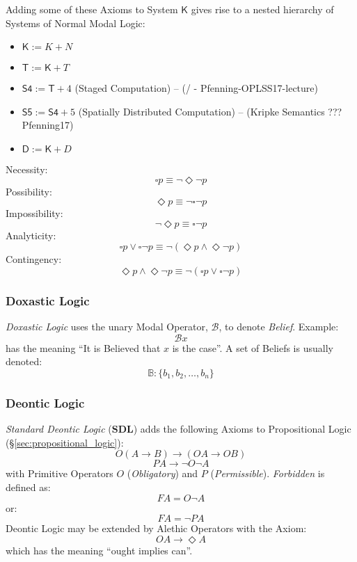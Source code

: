 Adding some of these Axioms to System $\mathsf{K}$ gives rise to a
nested hierarchy of Systems of Normal Modal Logic:
\begin{itemize}
  \item $\mathsf{K} := K + N$
  \item $\mathsf{T} := \mathsf{K} + T$
  \item $\mathsf{S4} := \mathsf{T} + 4$ (Staged Computation)
    \cite{wadler14} -- (/ -
    Pfenning-OPLSS17-lecture)
  \item $\mathsf{S5} := \mathsf{S4} + 5$
    (Spatially Distributed Computation) \cite{wadler14} -- (Kripke
    Semantics ??? Pfenning17)
  \item $\mathsf{D} := \mathsf{K} + D$
\end{itemize}

Necessity:
\[
  \square p \equiv \neg \Diamond \neg p
\]
Possibility:
\[
  \Diamond p \equiv \neg \square \neg p
\]
Impossibility:
\[
  \neg \Diamond p \equiv \square \neg p
\]
Analyticity:
\[
  \square p \vee \square \neg p
  \equiv \neg (\Diamond p \wedge \Diamond \neg p)
\]
Contingency:
\[
  \Diamond p \wedge \Diamond \neg p
  \equiv \neg (\square p \vee \square \neg p)
\]



\subsubsection{Doxastic Logic}\label{sec:doxastic_logic}

\emph{Doxastic Logic} uses the unary Modal Operator, $\mathcal{B}$, to
denote \emph{Belief}. Example:
\[
  \mathcal{B} x
\]
has the meaning ``It is Believed that $x$ is the case''. A set of
Beliefs is usually denoted:
\[
  \mathbb{B}: \{ b_1, b_2, \ldots, b_n \}
\]



\subsubsection{Deontic Logic}\label{sec:deontic_logic}

\emph{Standard Deontic Logic} ($\mathbf{SDL}$) adds the following
Axioms to Propositional Logic (\S\ref{sec:propositional_logic}):
\[
  O(A \rightarrow B) \rightarrow (OA \rightarrow OB)
\]
\[
  PA \rightarrow \neg O \neg A
\]
with Primitive Operators $O$ (\emph{Obligatory}) and $P$
(\emph{Permissible}). \emph{Forbidden} is defined as:
\[
  FA = O \neg A
\]
or:
\[
  FA = \neg P A
\]
Deontic Logic may be extended by Alethic Operators with the Axiom:
\[
  OA \rightarrow \Diamond A
\]
which has the meaning ``ought implies can''.



